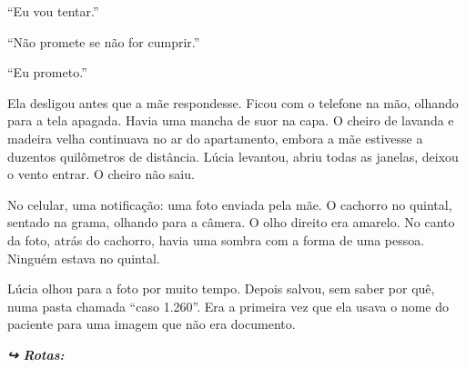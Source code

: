 \noindent ``Eu vou tentar.''

\noindent ``Não promete se não for cumprir.''

\noindent ``Eu prometo.''

\noindent Ela desligou antes que a mãe respondesse. Ficou com o telefone na mão, olhando para a tela apagada. Havia uma mancha de suor na capa. O cheiro de lavanda e madeira velha continuava no ar do apartamento, embora a mãe estivesse a duzentos quilômetros de distância. Lúcia levantou, abriu todas as janelas, deixou o vento entrar. O cheiro não saiu.

\noindent No celular, uma notificação: uma foto enviada pela mãe. O cachorro no quintal, sentado na grama, olhando para a câmera. O olho direito era amarelo. No canto da foto, atrás do cachorro, havia uma sombra com a forma de uma pessoa. Ninguém estava no quintal.

\noindent Lúcia olhou para a foto por muito tempo. Depois salvou, sem saber por quê, numa pasta chamada ``caso 1.260''. Era a primeira vez que ela usava o nome do paciente para uma imagem que não era documento.

\noindent\textit{\textbf{↪ Rotas:}  \rotasep {} \rotasep {}}
